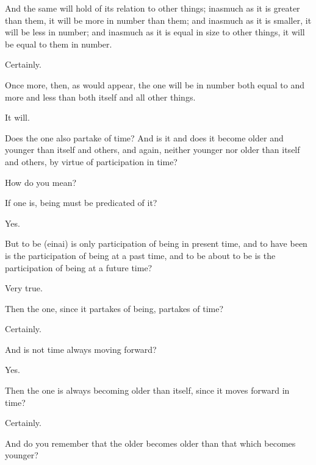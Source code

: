\documentclass[11pt,letter]{article}
\begin{document}
\par  And the same will hold of its relation to other things; inasmuch as it is greater than them, it will be more in number than them; and inasmuch as it is smaller, it will be less in number; and inasmuch as it is equal in size to other things, it will be equal to them in number.

\par  Certainly.

\par  Once more, then, as would appear, the one will be in number both equal to and more and less than both itself and all other things.

\par  It will.

\par  Does the one also partake of time? And is it and does it become older and younger than itself and others, and again, neither younger nor older than itself and others, by virtue of participation in time?

\par  How do you mean?

\par  If one is, being must be predicated of it?

\par  Yes.

\par  But to be (einai) is only participation of being in present time, and to have been is the participation of being at a past time, and to be about to be is the participation of being at a future time?

\par  Very true.

\par  Then the one, since it partakes of being, partakes of time?

\par  Certainly.

\par  And is not time always moving forward?

\par  Yes.

\par  Then the one is always becoming older than itself, since it moves forward in time?

\par  Certainly.

\par  And do you remember that the older becomes older than that which becomes younger?
\end{document}
